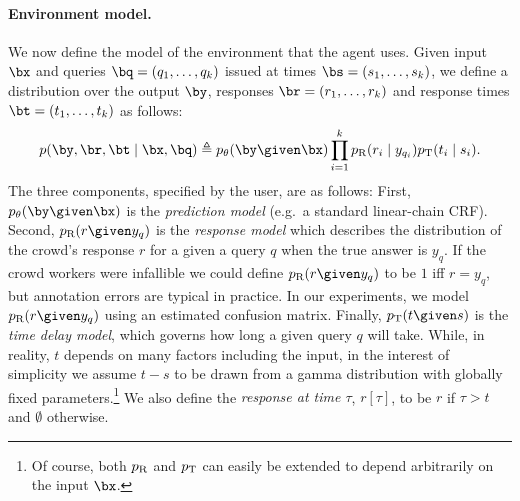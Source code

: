 


\paragraph{Environment model.}

We now define the model of the environment that the agent uses.
Given input $\bx$ and queries $\bq = (q_1, \dots, q_k)$ issued at times $\bs = (s_1, \dots, s_k)$,
we define a distribution over the output $\by$, responses $\br = (r_1, \dots, r_k)$
and response times $\bt = (t_1, \dots, t_k)$ as follows:
\begin{align}
  \label{eqn:dynamics}
p(\by, \br, \bt \mid \bx, \bq) \eqdef \p(\by \given \bx) \prod_{i=1}^k \presp(r_i \mid y_{q_i}) \ptime(t_i \mid s_i).
\end{align}
The three components, specified by the user, are as follows:
First, $\p(\by \given \bx)$ is the \emph{prediction model} (e.g.\ a standard linear-chain CRF).
Second, $\presp(r \given y_q)$ is the \emph{response model} which describes the distribution of the crowd's response $r$ for a given a query $q$ when the true answer is $y_q$.
%
If the crowd workers were infallible we could define $\presp(r \given y_q)$ to be $1$ iff $r = y_q$, but annotation errors are typical in practice. 
In our experiments, we model $\presp(r \given y_q)$ using an estimated confusion matrix.
%
Finally, $\ptime(t \given s)$ is the \emph{time delay model}, which governs how long a given query $q$ will take. While, in reality, $t$ depends on many factors including the input, in the interest of simplicity we assume $t - s$ to be drawn from a gamma distribution with globally fixed parameters.\footnote{
Of course, both $p_{\text{R}}$ and $p_{\text{T}}$ can easily be extended to depend arbitrarily on the input $\bx$.}
We also define the \emph{response at time $\tau$}, $r[\tau]$, to be $r$ if $\tau > t$ and $\emptyset$ otherwise.

